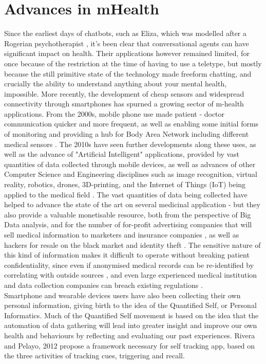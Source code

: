 \section{Advances in mHealth}
Since the earliest days of chatbots, such as Eliza, which was modelled after a Rogerian psychotherapist \cite{weizenbaum1966eliza}, it's been clear that conversational agents can have significant impact on health. Their applications however remained limited, for once because of the restriction at the time of having to use a teletype, but mostly because the still primitive state of the technology made freeform chatting, and crucially the ability to understand anything about your mental health, impossible. More recently, the development of cheap sensors and widespread connectivity through smartphones has spurned a growing sector of m-health applications. From the 2000s, mobile phone use made patient - doctor communication quicker and more frequent, as well as enabling some initial forms of monitoring and providing a hub for Body Area Network including different medical sensors \cite{Patrick2008}. The 2010s have seen further developments along these uses, as well as the advance of "Artificial Intelligent" applications, provided by vast quantities of data collected through mobile devices, as well as advances of other Computer Science and Engineering disciplines such as image recognition, virtual reality, robotics, drones, 3D-printing, and the Internet of Things (IoT) being applied to the medical field \cite{Pistorius2017}. The vast quantities of data being collected have helped to advance the state of the art on several medicinal application - but they also provide a valuable monetisable resource, both from the perspective of Big Data analysis, and for the number of for-profit advertising companies that will sell medical information to marketers and insurance companies \cite{tanner2016}, as well as hackers for resale on the black market and identity theft \cite{hackercare}. The sensitive nature of this kind of information makes it difficult to operate without breaking patient confidentiality, since even if anonymised medical records can be re-identified by correlating with outside sources \cite{Sweeney2001}, and even large experienced medical institution and data collection companies can breach existing regulations \cite{deepmindnhs}. \\
Smartphone and wearable devices users have also been collecting their own personal information, giving birth to the idea of the Quantified Self, or Personal Informatics. 
Much of the Quantified Self movement is based on the idea that the automation of data gathering will lead into greater insight and improve our own health and behaviours by reflecting and evaluating our past experiences. Rivera and Pelayo, 2012 \cite{Rivera-Pelayo2012} propose a framework necessary for self tracking app, based on the three activities of tracking cues, triggering and recall.
